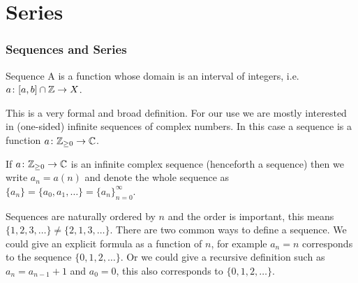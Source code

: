 \documentclass{article}
\newcommand{\intersection}{\cap}
\begin{document}
    \part{Series}
    \section{Sequences and Series}
    \begin{definition}{Sequence}{}
        A  is a function whose domain is an interval of integers, i.e. \(a\colon[a, b]\intersection\integers\to X\).
    \end{definition}
    This is a very formal and broad definition.
    For our use we are mostly interested in (one-sided) infinite sequences of complex numbers.
    In this case a sequence is a function \(a\colon \mathbb{Z}_{\ge0} \to \mathbb{C}\).
    
    \begin{notation*}{}
        If \(a\colon\mathbb{Z}_{\ge0}\to\mathbb{C}\) is an infinite complex sequence (henceforth a sequence) then we write \(a_n = a(n)\) and denote the whole sequence as \(\{a_n\} = \{a_0, a_1, \dotsc\} = \{a_n\}_{n=0}^{\infty}\).
    \end{notation*}
    Sequences are naturally ordered by \(n\) and the order is important, this means \(\{1, 2, 3, \dotsc\}\ne \{2, 1, 3, \dotsc\}\).
    There are two common ways to define a sequence.
    We could give an explicit formula as a function of \(n\), for example \(a_n = n\) corresponds to the sequence \(\{0, 1, 2, \dotsc\}\).
    Or we could give a recursive definition such as \(a_n = a_{n-1} + 1\) and \(a_0 = 0\), this also corresponds to \(\{0, 1, 2, \dotsc\}\).
    
\end{document}
